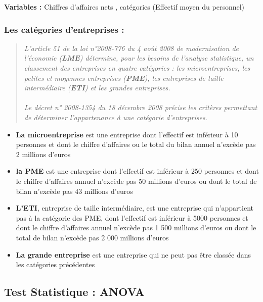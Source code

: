 \documentclass[mstat,12pt]{unswthesis}
\begin{document}
\bigskip

\textbf{Variables :} Chiffres d'affaires nets , catégories (Effectif
moyen du personnel)

\subsubsection{Les catégories d'entreprises
:}\label{les-catuxe9gories-dentreprises}

\bigskip
\scriptsize
\begin{quote}
\textit{L’article 51 de la loi n°2008-776 du 4 août 2008 de modernisation de l’économie (\textbf{LME}) détermine, pour les besoins de l’analyse statistique, un classement des entreprises en quatre catégories : les microentreprises, les petites et moyennes entreprises (\textbf{PME}), les entreprises de taille intermédiaire (\textbf{ETI}) et les grandes entreprises.\\ \\Le décret n° 2008-1354 du 18 décembre 2008 précise les critères permettant de déterminer l’appartenance à une catégorie d'entreprises.}
\end{quote}
\normalsize

\begin{itemize}[label=$\circ$]
  \item \textnormal{ \textbf{La microentreprise} est une entreprise dont l'effectif est inférieur à 10 personnes et dont le chiffre d'affaires ou le total du bilan annuel n'excède pas 2 millions d'euros}
\item \textnormal{ \textbf{la PME} est une entreprise dont l’effectif est inférieur à 250 personnes
et dont le chiffre d’affaires annuel n'excède pas 50 millions d'euros ou
dont le total de bilan n'excède pas 43 millions d'euros }
\item \textnormal{\textbf{L'ETI}, entreprise de taille intermédiaire, est une entreprise qui n'appartient pas à la catégorie des PME, dont l’effectif est inférieur à 5000 personnes et dont le chiffre d'affaires annuel n'excède pas 1 500 millions d'euros ou dont le total de bilan n'excède pas 2 000 millions d'euros}
\item \textnormal{\textbf{La grande entreprise} est une entreprise qui ne peut pas être classée
dans les catégories précédentes}
\end{itemize}

\newpage

\subsection{Test Statistique : ANOVA}\label{test-statistique-anova}
\end{document}
